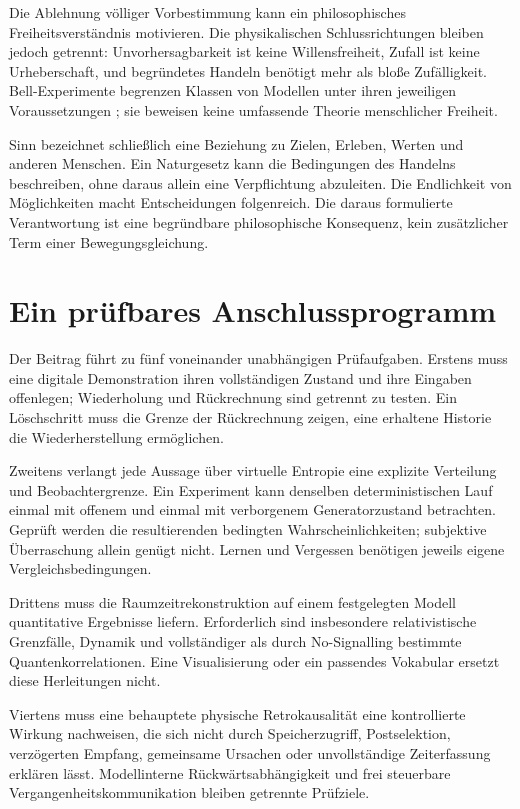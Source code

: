Die Ablehnung völliger Vorbestimmung kann ein philosophisches Freiheitsverständnis motivieren. Die physikalischen Schlussrichtungen bleiben jedoch getrennt: Unvorhersagbarkeit ist keine Willensfreiheit, Zufall ist keine Urheberschaft, und begründetes Handeln benötigt mehr als bloße Zufälligkeit. Bell-Experimente begrenzen Klassen von Modellen unter ihren jeweiligen Voraussetzungen \cite{11}; sie beweisen keine umfassende Theorie menschlicher Freiheit.

Sinn bezeichnet schließlich eine Beziehung zu Zielen, Erleben, Werten und anderen Menschen. Ein Naturgesetz kann die Bedingungen des Handelns beschreiben, ohne daraus allein eine Verpflichtung abzuleiten. Die Endlichkeit von Möglichkeiten macht Entscheidungen folgenreich. Die daraus formulierte Verantwortung ist eine begründbare philosophische Konsequenz, kein zusätzlicher Term einer Bewegungsgleichung.

\section{Ein prüfbares Anschlussprogramm}\label{de:sec12}
Der Beitrag führt zu fünf voneinander unabhängigen Prüfaufgaben. Erstens muss eine digitale Demonstration ihren vollständigen Zustand und ihre Eingaben offenlegen; Wiederholung und Rückrechnung sind getrennt zu testen. Ein Löschschritt muss die Grenze der Rückrechnung zeigen, eine erhaltene Historie die Wiederherstellung ermöglichen.

Zweitens verlangt jede Aussage über virtuelle Entropie eine explizite Verteilung und Beobachtergrenze. Ein Experiment kann denselben deterministischen Lauf einmal mit offenem und einmal mit verborgenem Generatorzustand betrachten. Geprüft werden die resultierenden bedingten Wahrscheinlichkeiten; subjektive Überraschung allein genügt nicht. Lernen und Vergessen benötigen jeweils eigene Vergleichsbedingungen.

Drittens muss die Raumzeitrekonstruktion auf einem festgelegten Modell quantitative Ergebnisse liefern. Erforderlich sind insbesondere relativistische Grenzfälle, Dynamik und vollständiger als durch No-Signalling bestimmte Quantenkorrelationen. Eine Visualisierung oder ein passendes Vokabular ersetzt diese Herleitungen nicht.

Viertens muss eine behauptete physische Retrokausalität eine kontrollierte Wirkung nachweisen, die sich nicht durch Speicherzugriff, Postselektion, verzögerten Empfang, gemeinsame Ursachen oder unvollständige Zeiterfassung erklären lässt. Modellinterne Rückwärtsabhängigkeit und frei steuerbare Vergangenheitskommunikation bleiben getrennte Prüfziele.

